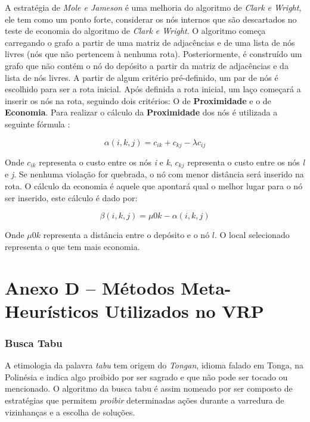 A estratégia de \emph{Mole e Jameson} é uma melhoria do algoritmo de \emph{Clark e Wright}, ele tem como um ponto forte, considerar os nós internos que são descartados no teste de economia do algoritmo de \emph{Clark e Wright}. O algoritmo começa carregando o grafo a partir de uma matriz de adjacências e de uma lista de nós livres (nós que não pertencem à nenhuma rota). Posteriormente, é construído um grafo que não contém o nó do depósito a partir da matriz de adjacências e da lista de nós livres. A partir de algum critério pré-definido, um par de nós é escolhido para ser a rota inicial. Após definida a rota inicial, um laço começará a inserir os nós na rota, seguindo dois critérios: O de \textbf{Proximidade} e o de \textbf{Economia}.
Para realizar o cálculo da \textbf{Proximidade} dos nós é utilizada a seguinte fórmula \cite[p. 33]{maxwell}:

\[\alpha(i, k, j) = c_{ik} + c_{kj} - \lambda c_{ij} \]

Onde $c_{ik}$ representa o custo entre os nós \emph{i} e \emph{k}, $c_{kj}$  representa o custo entre os nós \emph{l} e \emph{j}. Se nenhuma violação for quebrada, o nó com menor distância será inserido na rota. O cálculo da economia é aquele que apontará qual o melhor lugar para o nó ser inserido, este cálculo é dado por:

\[\beta(i, k, j) = \mu 0k - \alpha(i, k, j) \]


Onde \(\mu 0k\) representa a distância entre o depósito e o nó $l$. O local selecionado representa o que tem mais economia.

\chapter*{Anexo D -- Métodos Meta-Heurísticos Utilizados no VRP}
\label{anexo-metodos-metaheuristicos}
\subsection*{Busca Tabu}

A etimologia da palavra \emph{tabu} tem origem do \emph{Tongan}, idioma falado em Tonga, na Polinésia e indica algo proibido por ser sagrado e que não pode ser tocado ou mencionado. O algoritmo da busca tabu é assim nomeado por ser composto de estratégias que permitem \emph{proibir} determinadas ações durante a varredura de vizinhanças e a escolha de soluções.

